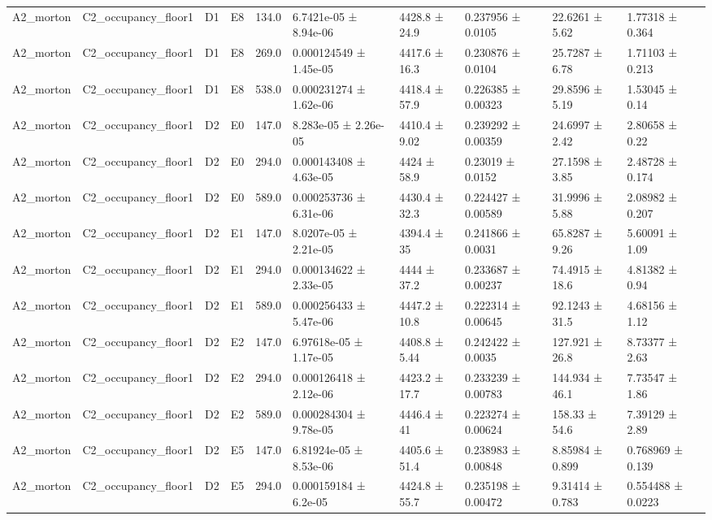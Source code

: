 \begin{table}
\begin{tabular}{llllllllll}
A2\_morton & C2\_occupancy\_floor1 & D1 & E8 & 134.0 & 6.7421e-05 ± 8.94e-06 & 4428.8 ± 24.9 & 0.237956 ± 0.0105 & 22.6261 ± 5.62 & 1.77318 ± 0.364 \\
A2\_morton & C2\_occupancy\_floor1 & D1 & E8 & 269.0 & 0.000124549 ± 1.45e-05 & 4417.6 ± 16.3 & 0.230876 ± 0.0104 & 25.7287 ± 6.78 & 1.71103 ± 0.213 \\
A2\_morton & C2\_occupancy\_floor1 & D1 & E8 & 538.0 & 0.000231274 ± 1.62e-06 & 4418.4 ± 57.9 & 0.226385 ± 0.00323 & 29.8596 ± 5.19 & 1.53045 ± 0.14 \\
A2\_morton & C2\_occupancy\_floor1 & D2 & E0 & 147.0 & 8.283e-05 ± 2.26e-05 & 4410.4 ± 9.02 & 0.239292 ± 0.00359 & 24.6997 ± 2.42 & 2.80658 ± 0.22 \\
A2\_morton & C2\_occupancy\_floor1 & D2 & E0 & 294.0 & 0.000143408 ± 4.63e-05 & 4424 ± 58.9 & 0.23019 ± 0.0152 & 27.1598 ± 3.85 & 2.48728 ± 0.174 \\
A2\_morton & C2\_occupancy\_floor1 & D2 & E0 & 589.0 & 0.000253736 ± 6.31e-06 & 4430.4 ± 32.3 & 0.224427 ± 0.00589 & 31.9996 ± 5.88 & 2.08982 ± 0.207 \\
A2\_morton & C2\_occupancy\_floor1 & D2 & E1 & 147.0 & 8.0207e-05 ± 2.21e-05 & 4394.4 ± 35 & 0.241866 ± 0.0031 & 65.8287 ± 9.26 & 5.60091 ± 1.09 \\
A2\_morton & C2\_occupancy\_floor1 & D2 & E1 & 294.0 & 0.000134622 ± 2.33e-05 & 4444 ± 37.2 & 0.233687 ± 0.00237 & 74.4915 ± 18.6 & 4.81382 ± 0.94 \\
A2\_morton & C2\_occupancy\_floor1 & D2 & E1 & 589.0 & 0.000256433 ± 5.47e-06 & 4447.2 ± 10.8 & 0.222314 ± 0.00645 & 92.1243 ± 31.5 & 4.68156 ± 1.12 \\
A2\_morton & C2\_occupancy\_floor1 & D2 & E2 & 147.0 & 6.97618e-05 ± 1.17e-05 & 4408.8 ± 5.44 & 0.242422 ± 0.0035 & 127.921 ± 26.8 & 8.73377 ± 2.63 \\
A2\_morton & C2\_occupancy\_floor1 & D2 & E2 & 294.0 & 0.000126418 ± 2.12e-06 & 4423.2 ± 17.7 & 0.233239 ± 0.00783 & 144.934 ± 46.1 & 7.73547 ± 1.86 \\
A2\_morton & C2\_occupancy\_floor1 & D2 & E2 & 589.0 & 0.000284304 ± 9.78e-05 & 4446.4 ± 41 & 0.223274 ± 0.00624 & 158.33 ± 54.6 & 7.39129 ± 2.89 \\
A2\_morton & C2\_occupancy\_floor1 & D2 & E5 & 147.0 & 6.81924e-05 ± 8.53e-06 & 4405.6 ± 51.4 & 0.238983 ± 0.00848 & 8.85984 ± 0.899 & 0.768969 ± 0.139 \\
A2\_morton & C2\_occupancy\_floor1 & D2 & E5 & 294.0 & 0.000159184 ± 6.2e-05 & 4424.8 ± 55.7 & 0.235198 ± 0.00472 & 9.31414 ± 0.783 & 0.554488 ± 0.0223 \\

\end{tabular}
\end{table}
